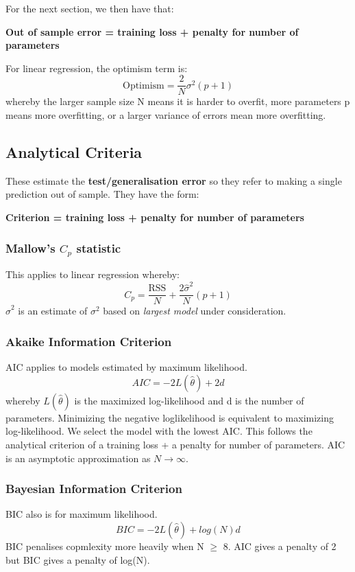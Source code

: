 \documentclass[11pt, oneside]{article}
\theoremstyle{definition}
\begin{document}
For the next section, we then have that:
\begin{center}
  \textbf{Out of sample error = training loss + penalty for number of parameters}
\end{center}

For linear regression, the optimism term is:
$$
\text{Optimism} = \frac{2}{N}\sigma^2(p+1)
$$
whereby the larger sample size N means it is harder to overfit, more parameters p means more overfitting, or a larger variance of errors mean more overfitting.

\subsection{Analytical Criteria}
These estimate the \textbf{test/generalisation error} so they refer to making a single prediction out of sample. They have the form:
\begin{center}
  \textbf{Criterion = training loss + penalty for number of parameters}
\end{center}

\subsubsection{Mallow's $C_p$ statistic}
This applies to linear regression whereby:
$$
  C_p = \frac{\text{RSS}}{N} + \frac{2\hat{\sigma}^2}{N}(p+1)
$$
$\hat{\sigma}^2$ is an estimate of $\sigma^2$ based on \textit{largest model} under consideration.

\subsubsection{Akaike Information Criterion}
AIC applies to models estimated by maximum likelihood.
$$
AIC = -2L(\hat{\theta}) + 2d
$$
whereby $L(\hat{\theta})$ is the maximized log-likelihood and d is the number of parameters. Minimizing the negative loglikelihood is equivalent to maximizing log-likelihood. We select the model with the lowest AIC. This follows the analytical criterion of a training loss + a penalty for number of parameters. AIC is an asymptotic approximation as $N \rightarrow \infty$.

\subsubsection{Bayesian Information Criterion}
BIC also is for maximum likelihood.
$$
BIC = -2L(\hat{\theta}) + log(N)d
$$
BIC penalises copmlexity more heavily when N $\geq$ 8. AIC gives a penalty of 2 but BIC gives a penalty of log(N).
\end{document}
